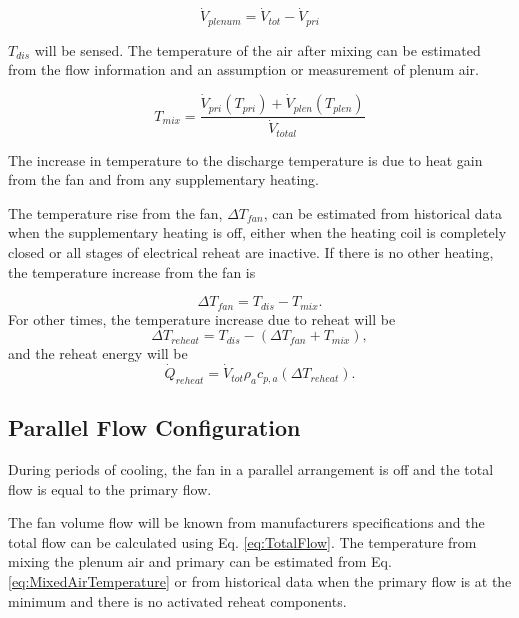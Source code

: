 \begin{equation} \label{eq:TotalFlow}
{\dot V_{plenum}} = {\dot V_{tot}} - {\dot V_{pri}}
\end{equation}

\(T_{dis}\) will be sensed. The temperature of the air after mixing can be estimated from the flow information and an assumption or measurement of plenum air. 


\begin{equation} \label{eq:MixedAirTemperature}
{T_{mix}} = \frac{{{{\dot V}_{pri}}\left( {{T_{pri}}} \right) + \dot V_{plen}\left( {{T_{plen}}} \right)}}{{{{\dot V}_{total}}}}
\end{equation}




The increase in temperature to the discharge temperature is due to heat gain from the fan and from any supplementary heating.

The temperature rise from the fan, \(\Delta T_{fan}\), can be estimated from historical data when the supplementary heating is off, either when the heating coil is completely closed or all stages of electrical reheat are inactive. If there is no other heating, the temperature increase from the fan is

\begin{equation}
\Delta {T_{fan}} = {T_{dis}} - {T_{mix}}.
\end{equation}
%
For other times, the temperature increase due to reheat will be
%
\begin{equation}
\Delta {T_{reheat}} = {T_{dis}} - \left( {\Delta {T_{fan}} + {T_{mix}}} \right),
\end{equation}
%
and the reheat energy will be
%
\begin{equation}
{\dot Q_{reheat}} = {\dot V_{tot}}{\rho _a}{c_{p,a}}\left( {\Delta {T_{reheat}}} \right).
\end{equation}

\subsection{Parallel Flow Configuration}

During periods of cooling, the fan in a parallel arrangement is off and the total flow is equal to the primary flow.

The fan volume flow will be known from manufacturers specifications and the total flow can be calculated using Eq. \eqref{eq:TotalFlow}. The temperature from mixing the plenum air and primary can be estimated from Eq. \eqref{eq:MixedAirTemperature} or from historical data when the primary flow is at the minimum and there is no activated reheat components.

